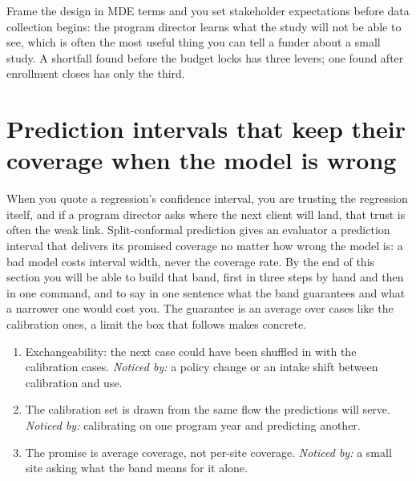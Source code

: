 \documentclass[
    a4paper,
    fontsize=10pt,
    twoside=true,
    numbers=noenddot,
]{kaobook}
\newenvironment{restson}[1][What this depends on]{%
    \begin{restsonbox}[frametitle={#1}]%
}{%
    \end{restsonbox}%
}
\begin{document}
Frame the design in MDE terms and you set stakeholder expectations before data collection begins: the program director learns what the study will not be able to see, which is often the most useful thing you can tell a funder about a small study. A shortfall found before the budget locks has three levers; one found after enrollment closes has only the third.

\section{Prediction intervals that keep their coverage when the model is wrong}\label{sec:conformal}
When you quote a regression's confidence interval, you are trusting the regression itself, and if a program director asks where the next client will land, that trust is often the weak link. Split-conformal prediction gives an evaluator a prediction interval that delivers its promised coverage no matter how wrong the model is: a bad model costs interval width, never the coverage rate. By the end of this section you will be able to build that band, first in three steps by hand and then in one command, and to say in one sentence what the band guarantees and what a narrower one would cost you. The guarantee is an average over cases like the calibration ones, a limit the box that follows makes concrete.

\begin{restson}[What the conformal guarantee depends on]
\begin{enumerate}
\item Exchangeability: the next case could have been shuffled in with the calibration cases. \emph{Noticed by:} a policy change or an intake shift between calibration and use.
\item The calibration set is drawn from the same flow the predictions will serve. \emph{Noticed by:} calibrating on one program year and predicting another.
\item The promise is average coverage, not per-site coverage. \emph{Noticed by:} a small site asking what the band means for it alone.
\end{enumerate}
\end{restson}
\end{document}
